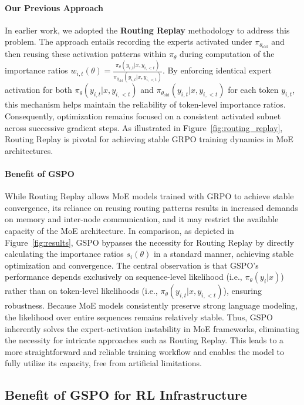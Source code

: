 \paragraph{Our Previous Approach} In earlier work, we adopted the \textbf{Routing Replay} methodology to address this problem. The approach entails recording the experts activated under $\pi_{\theta_\text{old}}$ and then reusing these activation patterns within $\pi_{\theta}$ during computation of the importance ratios $w_{i,t}(\theta) = \frac{ \pi_{\theta} (y_{i,t} | x, y_{i,<t}) }{ \pi_{\theta_\text{old}} (y_{i,t} | x,y_{i,<t})}$. By enforcing identical expert activation for both $\pi_{\theta} (y_{i,t} | x, y_{i,<t})$ and $\pi_{\theta_\text{old}} (y_{i,t} | x,y_{i,<t})$ for each token $y_{i,t}$, this mechanism helps maintain the reliability of token-level importance ratios. Consequently, optimization remains focused on a consistent activated subnet across successive gradient steps. As illustrated in Figure~\ref{fig:routing_replay}, Routing Replay is pivotal for achieving stable GRPO training dynamics in MoE architectures.

\paragraph{Benefit of GSPO} While Routing Replay allows MoE models trained with GRPO to achieve stable convergence, its reliance on reusing routing patterns results in increased demands on memory and inter-node communication, and it may restrict the available capacity of the MoE architecture. In comparison, as depicted in Figure~\ref{fig:results}, GSPO bypasses the necessity for Routing Replay by directly calculating the importance ratios $s_i(\theta)$ in a standard manner, achieving stable optimization and convergence. The central observation is that GSPO’s performance depends exclusively on sequence-level likelihood (i.e., $\pi_{\theta} (y_i | x)$) rather than on token-level likelihoods (i.e., $\pi_{\theta} (y_{i,t} | x, y_{i,<t})$), ensuring robustness. Because MoE models consistently preserve strong language modeling, the likelihood over entire sequences remains relatively stable. Thus, GSPO inherently solves the expert-activation instability in MoE frameworks, eliminating the necessity for intricate approaches such as Routing Replay. This leads to a more straightforward and reliable training workflow and enables the model to fully utilize its capacity, free from artificial limitations.

\subsection{Benefit of GSPO for RL Infrastructure}

